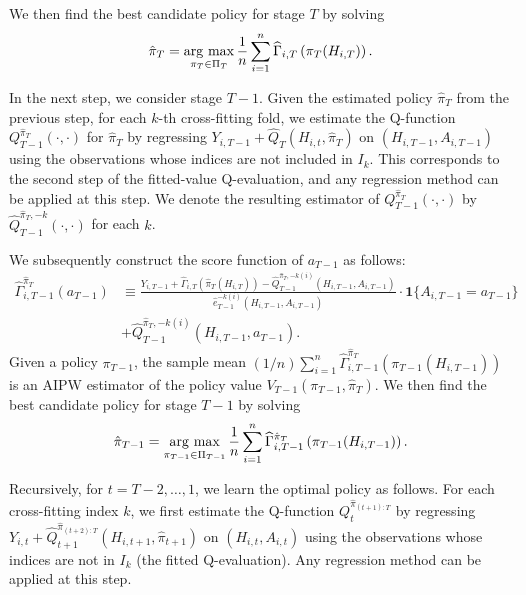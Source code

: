 We then find the best candidate policy for stage $T$ by solving
\begin{align*}
\hat{\pi}_{T} = \argmax_{\pi_{T}\in \Pi_{T}}\frac{1}{n}\sum_{i=1}^{n}\widehat{\Gamma}_{i,T}\left(\pi_T(H_{i,T})\right). %
\end{align*}


In the next step, we consider stage $T-1$. Given the estimated policy $\hat{\pi}_{T}$ from the previous step, for each $k$-th cross-fitting fold, we estimate the Q-function  $Q_{T-1}^{\hat{\pi}_{T}} (\cdot,\cdot)$ for $\hat{\pi}_{T}$ by regressing $Y_{i,T-1} + \widehat{Q}_{T}(H_{i,t},\hat{\pi}_{T})$ on $(H_{i,T-1},A_{i,T-1})$ using the observations whose indices are not included in $I_k$. This corresponds to the second step of the fitted-value Q-evaluation, and any regression method can be applied at this step. We denote the resulting estimator of $Q_{T-1}^{\hat{\pi}_{T}}(\cdot,\cdot)$ by $\widehat{Q}_{T-1}^{\hat{\pi}_{T},-k}(\cdot,\cdot)$ for each $k$. 

We subsequently construct the score function of $a_{T-1}$ as follows:
\begin{align*}
    \widehat{\Gamma}_{i,T-1}^{\hat{\pi}_{T}}(a_{T-1})  &\equiv \frac{ Y_{i,T-1} + \widehat{\Gamma}_{i,T}(\hat{\pi}_{T}(H_{i,T})) - \widehat{Q}_{T-1}^{\hat{\pi}_{T},-k(i)}(H_{i,T-1},A_{i,T-1}) }{\hat{e}_{T-1}^{-k(i)}(H_{i,T-1},A_{i,T-1})} \cdot \mathbf{1}\{A_{i,T-1} = a_{T-1}\} \\
    &+ 
\widehat{Q}_{T-1}^{\hat{\pi}_{T},-k(i)}(H_{i,T-1},a_{T-1}).
\end{align*}
Given a policy $\pi_{T-1}$, the sample mean $(1/n)\sum_{i=1}^{n}\widehat{\Gamma}_{i,T-1}^{\hat{\pi}_{T}}(\pi_{T-1}(H_{i,T-1}))$ is an AIPW estimator of the policy value $V_{T-1}(\pi_{T-1},\hat{\pi}_{T})$.
We then find the best candidate policy for stage $T-1$ by solving
\begin{align*}
    \hat{\pi}_{T-1} = \mathop{\rm arg~max}\limits_{\pi_{T-1}\in \Pi_{T-1}} \frac{1}{n}\sum_{i=1}^{n}\widehat{\Gamma}_{i,T-1}^{\hat{\pi}_T}\left(\pi_{T-1}(H_{i,T-1})\right).
\end{align*}

Recursively, for $t=T-2,\ldots,1$, we learn the optimal policy as follows. For each cross-fitting index $k$, we first estimate the Q-function $Q_{t}^{\hat{\pi}_{(t+1):T}}$ by regressing  $Y_{i,t} + \widehat{Q}_{t+1}^{\hat{\pi}_{(t+2):T}}(H_{i,t+1},\hat{\pi}_{t+1})$ on $(H_{i,t},A_{i,t})$ using the observations whose indices are not in $I_k$ (the fitted Q-evaluation). Any regression method can be applied at this step. 

